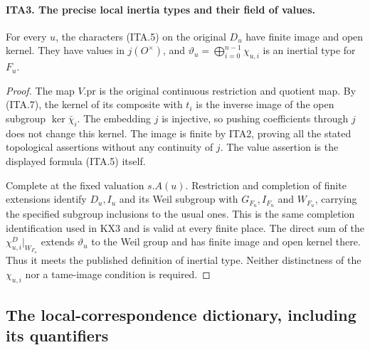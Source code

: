 \paragraph{ITA3. The precise local inertia types and their field of values.}
\label{claim:ITA3}
For every $u$, the characters (ITA.5) on the original $D_u$
have finite image and open kernel.  They have values in
$j(O^\times)$, and
$\vartheta_u=\bigoplus_{i=0}^{n-1}\chi_{u,i}$ is an
inertial type for $F_u$.
\begin{proof}
The map $V.\mathrm{pr}$ is the original continuous restriction
and quotient map.  By (ITA.7), the kernel of its composite
with $t_i$ is the inverse image of the open subgroup
$\ker\bar\chi_i$.  The embedding $j$ is injective, so
pushing coefficients through $j$ does not change this
kernel.  The image is finite by ITA2, proving all the stated
topological assertions without any continuity of $j$.
The value assertion is the displayed formula (ITA.5) itself.

Complete at the fixed valuation $s.A(u)$.  Restriction and
completion of finite extensions identify $D_u,I_u$ and its
Weil subgroup with $G_{F_u},I_{F_u}$ and $W_{F_u}$, carrying
the specified subgroup inclusions to the usual ones.  This
is the same completion identification used in KX3 and is
valid at every finite place.  The direct sum of the
$\chi^D_{u,i}|_{W_{F_u}}$ extends $\vartheta_u$ to the
Weil group and has finite image and open kernel there.
Thus it meets the published definition of inertial type.
Neither distinctness of the $\chi_{u,i}$ nor a tame-image
condition is required.
\end{proof}

\subsection{The local-correspondence dictionary, including its quantifiers}


